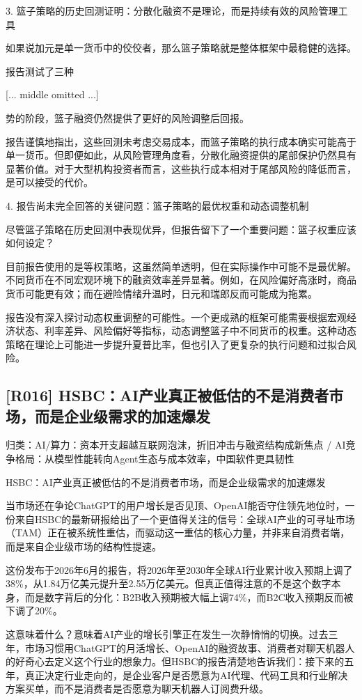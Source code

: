 \documentclass[11pt]{ctexart}
\begin{document}
3. 篮子策略的历史回测证明：分散化融资不是理论，而是持续有效的风险管理工具

如果说加元是单一货币中的佼佼者，那么篮子策略就是整体框架中最稳健的选择。

报告测试了三种

[... middle omitted ...]

势的阶段，篮子融资仍然提供了更好的风险调整后回报。

报告谨慎地指出，这些回测未考虑交易成本，而篮子策略的执行成本确实可能高于单一货币。但即便如此，从风险管理角度看，分散化融资提供的尾部保护仍然具有显著价值。对于大型机构投资者而言，这些执行成本相对于尾部风险的降低而言，是可以接受的代价。

4. 报告尚未完全回答的关键问题：篮子策略的最优权重和动态调整机制

尽管篮子策略在历史回测中表现优异，但报告留下了一个重要问题：篮子权重应该如何设定？

目前报告使用的是等权策略，这虽然简单透明，但在实际操作中可能不是最优解。不同货币在不同宏观环境下的融资效率差异显著。例如，在风险偏好高涨时，商品货币可能更有效；而在避险情绪升温时，日元和瑞郎反而可能成为拖累。

报告没有深入探讨动态权重调整的可能性。一个更成熟的框架可能需要根据宏观经济状态、利率差异、风险偏好等指标，动态调整篮子中不同货币的权重。这种动态策略在理论上可能进一步提升夏普比率，但也引入了更复杂的执行问题和过拟合风险。

\subsection{[R016] HSBC：AI产业真正被低估的不是消费者市场，而是企业级需求的加速爆发}
{\small\color{refgray}归类：AI/算力：资本开支超越互联网泡沫，折旧冲击与融资结构成新焦点 / AI竞争格局：从模型性能转向Agent生态与成本效率，中国软件更具韧性}

HSBC：AI产业真正被低估的不是消费者市场，而是企业级需求的加速爆发

当市场还在争论ChatGPT的用户增长是否见顶、OpenAI能否守住领先地位时，一份来自HSBC的最新研报给出了一个更值得关注的信号：全球AI产业的可寻址市场（TAM）正在被系统性重估，而驱动这一重估的核心力量，并非来自消费者端，而是来自企业级市场的结构性提速。

这份发布于2026年6月的报告，将2026年至2030年全球AI行业累计收入预期上调了38\%，从1.84万亿美元提升至2.55万亿美元。但真正值得注意的不是这个数字本身，而是数字背后的分化：B2B收入预期被大幅上调74\%，而B2C收入预期反而被下调了20\%。

这意味着什么？意味着AI产业的增长引擎正在发生一次静悄悄的切换。过去三年，市场习惯用ChatGPT的月活增长、OpenAI的融资故事、消费者对聊天机器人的好奇心去定义这个行业的想象力。但HSBC的报告清楚地告诉我们：接下来的五年，真正决定行业走向的，是企业客户是否愿意为AI代理、代码工具和行业解决方案买单，而不是消费者是否愿意为聊天机器人订阅费升级。
\end{document}
